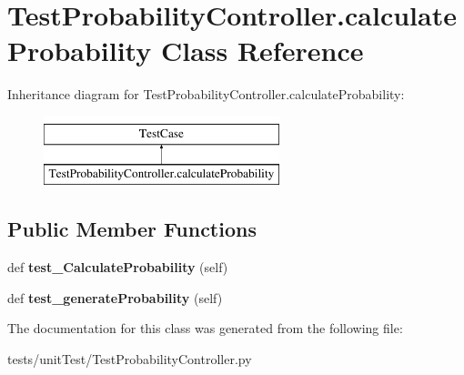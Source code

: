 \hypertarget{class_test_probability_controller_1_1calculate_probability}{}\section{Test\+Probability\+Controller.\+calculate\+Probability Class Reference}
\label{class_test_probability_controller_1_1calculate_probability}
Inheritance diagram for Test\+Probability\+Controller.\+calculate\+Probability\+:\begin{figure}[H]
\begin{center}
\leavevmode
\includegraphics[height=2.000000cm]{class_test_probability_controller_1_1calculate_probability}
\end{center}
\end{figure}
\subsection*{Public Member Functions}
\begin{DoxyCompactItemize}
\item 
\mbox{\label{class_test_probability_controller_1_1calculate_probability_a83dac9fb4705312b828a213df201de70}} 
def {\bfseries test\+\_\+\+Calculate\+Probability} (self)
\item 
\mbox{\label{class_test_probability_controller_1_1calculate_probability_a8611411d74024a9f7dd981d5ddd5217b}} 
def {\bfseries test\+\_\+generate\+Probability} (self)
\end{DoxyCompactItemize}


The documentation for this class was generated from the following file\+:\begin{DoxyCompactItemize}
\item 
tests/unit\+Test/Test\+Probability\+Controller.\+py\end{DoxyCompactItemize}
